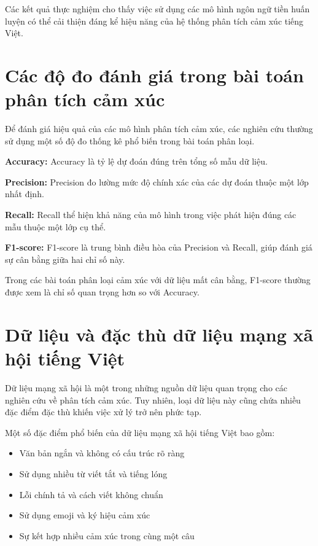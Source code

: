 \documentclass[14pt, a4paper]{report}
\begin{document}
Các kết quả thực nghiệm cho thấy việc sử dụng các mô hình ngôn ngữ tiền huấn luyện có thể cải thiện đáng kể hiệu năng của hệ thống phân tích cảm xúc tiếng Việt.

\section{Các độ đo đánh giá trong bài toán phân tích cảm xúc}

Để đánh giá hiệu quả của các mô hình phân tích cảm xúc, các nghiên cứu thường sử dụng một số độ đo thống kê phổ biến trong bài toán phân loại.

\textbf{Accuracy:} Accuracy là tỷ lệ dự đoán đúng trên tổng số mẫu dữ liệu.

\textbf{Precision:} Precision đo lường mức độ chính xác của các dự đoán thuộc một lớp nhất định.

\textbf{Recall:} Recall thể hiện khả năng của mô hình trong việc phát hiện đúng các mẫu thuộc một lớp cụ thể.

\textbf{F1-score:} F1-score là trung bình điều hòa của Precision và Recall, giúp đánh giá sự cân bằng giữa hai chỉ số này.

Trong các bài toán phân loại cảm xúc với dữ liệu mất cân bằng, F1-score thường được xem là chỉ số quan trọng hơn so với Accuracy.

\section{Dữ liệu và đặc thù dữ liệu mạng xã hội tiếng Việt}

Dữ liệu mạng xã hội là một trong những nguồn dữ liệu quan trọng cho các nghiên cứu về phân tích cảm xúc. Tuy nhiên, loại dữ liệu này cũng chứa nhiều đặc điểm đặc thù khiến việc xử lý trở nên phức tạp.

Một số đặc điểm phổ biến của dữ liệu mạng xã hội tiếng Việt bao gồm:

\begin{itemize}
    \item Văn bản ngắn và không có cấu trúc rõ ràng
    \item Sử dụng nhiều từ viết tắt và tiếng lóng
    \item Lỗi chính tả và cách viết không chuẩn
    \item Sử dụng emoji và ký hiệu cảm xúc
    \item Sự kết hợp nhiều cảm xúc trong cùng một câu
\end{itemize}
\end{document}
